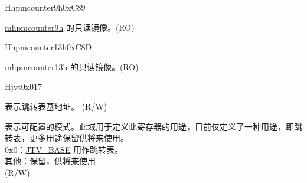\begin{register}{H}{hpmcounter9h}{0xC89}\label{regdesc:HPMCOUNTER9H}
%
\regnewline%
\begin{regdesc}\begin{reglist}
\label{fielddesc:HPMCOUNTER9H}\item [HPMCOUNTER9H] \hyperref[regdesc:MHPMCOUNTER9H]{mhpmcounter9h} 的只读镜像。(RO)
\end{reglist}\end{regdesc}
\end{register}


\begin{register}{H}{hpmcounter13h}{0xC8D}\label{regdesc:HPMCOUNTER13H}
%
\regnewline%
\begin{regdesc}\begin{reglist}
\label{fielddesc:HPMCOUNTER13H}\item [HPMCOUNTER13H] \hyperref[regdesc:MHPMCOUNTER13H]{mhpmcounter13h} 的只读镜像。(RO)
\end{reglist}\end{regdesc}
\end{register}





\begin{register}{H}{jvt}{0x017}\label{regdesc:JVT}%
%
%
\regnewline%
\begin{regdesc}\begin{reglist}
\label{fielddesc:JVT_BASE}\item [BASE] 表示跳转表基地址。 (R/W)
\label{fielddesc:JVT_MODE}\item [MODE] 表示可配置的模式。此域用于定义此寄存器的用途，目前仅定义了一种用途，即跳转表，更多用途保留供将来使用。\\
0x0：\hyperref[fielddesc:JVT_BASE]{JTV\_BASE} 用作跳转表。\\
其他：保留，供将来使用\\
(R/W)
\end{reglist}\end{regdesc}
\end{register}

